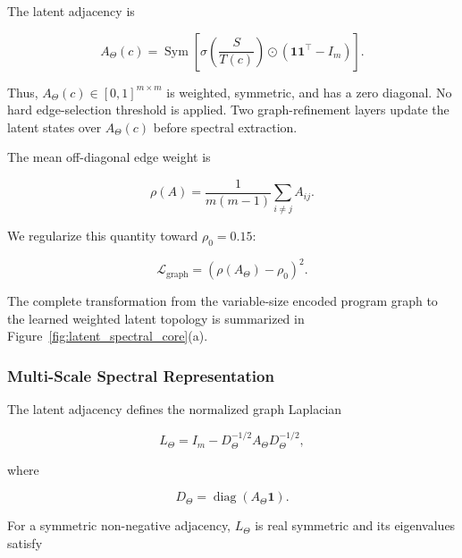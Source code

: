 \documentclass[authoryear,final,5p,times,twocolumn]{elsarticle}
\theoremstyle{plain}
\begin{document}
The latent adjacency is

\begin{equation}
\label{eq:latent_adjacency}
A_{\Theta}(c)
=
\operatorname{Sym}
\left[
    \sigma
    \left(
        \frac{S}{T(c)}
    \right)
    \odot
    \left(
        \mathbf{1}\mathbf{1}^{\top}-I_m
    \right)
\right].
\end{equation}

Thus,
$A_{\Theta}(c)\in[0,1]^{m\times m}$ is weighted, symmetric, and has a zero
diagonal. No hard edge-selection threshold is applied. Two graph-refinement
layers update the latent states over $A_{\Theta}(c)$ before spectral
extraction.

The mean off-diagonal edge weight is

\begin{equation}
\label{eq:latent_density}
\rho(A)
=
\frac{1}{m(m-1)}
\sum_{i\neq j}
A_{ij}.
\end{equation}

We regularize this quantity toward $\rho_0=0.15$:

\begin{equation}
\label{eq:density_regularizer}
\mathcal{L}_{\mathrm{graph}}
=
\left(
    \rho(A_{\Theta})-\rho_0
\right)^2.
\end{equation}

The complete transformation from the variable-size encoded program graph to
the learned weighted latent topology is summarized in
Figure~\ref{fig:latent_spectral_core}(a).


\subsubsection{Multi-Scale Spectral Representation}
\label{sec:multiscale_spectral}

The latent adjacency defines the normalized graph Laplacian

\begin{equation}
\label{eq:latent_laplacian}
L_{\Theta}
=
I_m
-
D_{\Theta}^{-1/2}
A_{\Theta}
D_{\Theta}^{-1/2},
\end{equation}

where

\begin{equation}
D_{\Theta}
=
\operatorname{diag}
\left(
    A_{\Theta}\mathbf{1}
\right).
\end{equation}

For a symmetric non-negative adjacency, $L_{\Theta}$ is real symmetric and
its eigenvalues satisfy \cite{??}
\end{document}

